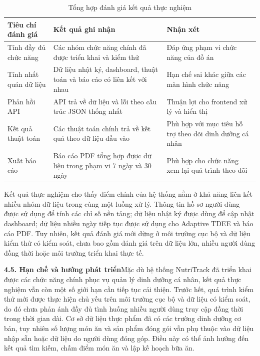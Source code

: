 \begin{table}[H]
\centering
\caption{Tổng hợp đánh giá kết quả thực nghiệm}
\begin{tabular}{|p{4cm}|p{5.5cm}|p{5.5cm}|}
\hline
\textbf{Tiêu chí đánh giá} & \textbf{Kết quả ghi nhận} & \textbf{Nhận xét} \\ \hline
Tính đầy đủ chức năng & Các nhóm chức năng chính đã được triển khai và kiểm thử & Đáp ứng phạm vi chức năng của đồ án \\ \hline
Tính nhất quán dữ liệu & Dữ liệu nhật ký, dashboard, thuật toán và báo cáo có liên kết với nhau & Hạn chế sai khác giữa các màn hình chức năng \\ \hline
Phản hồi API & API trả về dữ liệu và lỗi theo cấu trúc JSON thống nhất & Thuận lợi cho frontend xử lý và hiển thị \\ \hline
Kết quả thuật toán & Các thuật toán chính trả về kết quả theo dữ liệu đầu vào & Phù hợp với mục tiêu hỗ trợ theo dõi dinh dưỡng cá nhân \\ \hline
Xuất báo cáo & Báo cáo PDF tổng hợp được dữ liệu trong phạm vi 7 ngày và 30 ngày & Phù hợp cho chức năng xem lại quá trình theo dõi \\ \hline
\end{tabular}
\end{table}

Kết quả thực nghiệm cho thấy điểm chính của hệ thống nằm ở khả năng liên kết nhiều nhóm dữ liệu trong cùng một luồng xử lý. Thông tin hồ sơ người dùng được sử dụng để tính các chỉ số nền tảng; dữ liệu nhật ký được dùng để cập nhật dashboard; dữ liệu nhiều ngày tiếp tục được sử dụng cho Adaptive TDEE và báo cáo PDF. Tuy nhiên, kết quả đánh giá mới dừng ở môi trường cục bộ và dữ liệu kiểm thử có kiểm soát, chưa bao gồm đánh giá trên dữ liệu lớn, nhiều người dùng đồng thời hoặc môi trường triển khai thực tế.

\textbf{4.5. Hạn chế và hướng phát triển}Mặc dù hệ thống NutriTrack đã triển khai được các chức năng chính phục vụ quản lý dinh dưỡng cá nhân, kết quả thực nghiệm vẫn còn một số giới hạn cần tiếp tục cải thiện. Trước hết, quá trình kiểm thử mới được thực hiện chủ yếu trên môi trường cục bộ và dữ liệu có kiểm soát, do đó chưa phản ánh đầy đủ tình huống nhiều người dùng truy cập đồng thời trong thời gian dài. Cơ sở dữ liệu thực phẩm đã có các trường dinh dưỡng cơ bản, tuy nhiên số lượng món ăn và sản phẩm đóng gói vẫn phụ thuộc vào dữ liệu nhập sẵn hoặc dữ liệu do người dùng đóng góp. Điều này có thể ảnh hưởng đến kết quả tìm kiếm, chấm điểm món ăn và lập kế hoạch bữa ăn.

